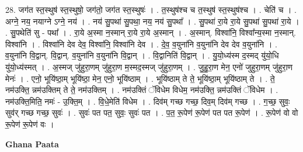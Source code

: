 \documentclass[17pt]{extarticle}
\begin{document}
28. जग॑त स्त॒स्थुष॑ स्त॒स्थुषो॒ जग॑तो॒ जग॑त स्त॒स्थुषः॑ । . त॒स्थुष॑श्च च त॒स्थुष॑ स्त॒स्थुष॑श्च । . चेति॑ च । . अग्ने॒ नय॒ नयाग्ने ऽग्ने॒ नय॑ । . नय॑ सु॒पथा॑ सु॒पथा॒ नय॒ नय॑ सु॒पथा᳚ । . सु॒पथा॑ रा॒ये रा॒ये सु॒पथा॑ सु॒पथा॑ रा॒ये । . सु॒पथेति॑ सु - पथा᳚ । . रा॒ये अ॒स्मा न॒स्मान् रा॒ये रा॒ये अ॒स्मान् । . अ॒स्मान्. विश्वा॑नि॒ विश्वा᳚न्य॒स्मा न॒स्मान्. विश्वा॑नि । . विश्वा॑नि देव देव॒ विश्वा॑नि॒ विश्वा॑नि देव । . दे॒व॒ व॒युना॑नि व॒युना॑नि देव देव व॒युना॑नि । . व॒युना॑नि वि॒द्वान्. वि॒द्वान्. व॒युना॑नि व॒युना॑नि वि॒द्वान् । . वि॒द्वानिति॑ वि॒द्वान् । . यु॒यो॒ध्य॑स्म द॒स्मद् यु॑यो॒धि यु॑यो॒ध्य॑स्मत् । . अ॒स्मज् जु॑हुरा॒णम् जु॑हुरा॒ण म॒स्मद॒स्मज् जु॑हुरा॒णम् । . जु॒हु॒रा॒ण मेन॒ एनो॑ जुहुरा॒णम् जु॑हुरा॒ण मेनः॑ । . एनो॒ भूयि॑ष्ठा॒म् भूयि॑ष्ठा॒ मेन॒ एनो॒ भूयि॑ष्ठाम् । . भूयि॑ष्ठाम् ते ते॒ भूयि॑ष्ठा॒म् भूयि॑ष्ठाम् ते । . ते॒ नम॑उक्ति॒ न्नम॑उक्तिम् ते ते॒ नम॑उक्तिम् । . नम॑उक्तिं ॅविधेम विधेम॒ नम॑उक्ति॒ न्नम॑उक्तिं ॅविधेम । . नम॑उक्ति॒मिति॒ नमः॑ - उ॒क्ति॒म् । . वि॒धे॒मेति॑ विधेम । . दिव॑म् गच्छ गच्छ॒ दिव॒म् दिव॑म् गच्छ । . ग॒च्छ॒ सुवः॒ सुव॑र् गच्छ गच्छ॒ सुवः॑ । . सुवः॑ पत पत॒ सुवः॒ सुवः॑ पत । . प॒त॒ रू॒पेण॑ रू॒पेण॑ पत पत रू॒पेण॑ । . रू॒पेण॑ वो वो रू॒पेण॑ रू॒पेण॑ वः । \newline

\textbf{Ghana Paata } \newline
\end{document}

